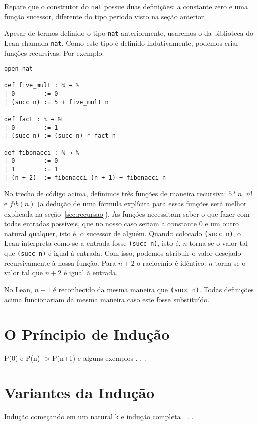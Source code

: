 Repare que o construtor do \lstinline{nat} possue duas definições: a constante zero e uma função sucessor, diferente do tipo periodo visto na seção anterior.

Apesar de termos definido o tipo \lstinline{nat} anteriormente, usaremos o da biblioteca do Lean chamada \lstinline{nat}. Como este tipo é definido indutivamente, podemos criar funções recursivas. Por exemplo:

\begin{lstlisting}
open nat

def five_mult : ℕ → ℕ
| 0        := 0
| (succ n) := 5 + five_mult n

def fact : ℕ → ℕ
| 0        := 1
| (succ n) := (succ n) * fact n

def fibonacci : ℕ → ℕ
| 0        := 0
| 1        := 1
| (n + 2)  := fibonacci (n + 1) + fibonacci n
\end{lstlisting}

No trecho de código acima, definimos três funções de maneira recursiva: $5*n$, $n!$ e $fib(n)$ (a dedução de uma fórmula explícita para essas funções será melhor explicada na seção~\ref{sec:recursao}). As funções necessitam saber o que fazer com todas entradas possíveis, que no nosso caso seriam a constante $0$ e um outro natural qualquer, isto é, o sucessor de alguém. Quando colocado \lstinline{(succ n)}, o Lean interpreta como se a entrada fosse \lstinline{(succ n)}, isto é, $n$ torna-se o valor tal que \lstinline{(succ n)} é igual à entrada. Com isso, podemos atribuir o valor desejado recursivamente à nossa função. Para $n+2$ o raciocínio é idêntico: $n$ torna-se o valor tal que $n+2$ é igual à entrada.

No Lean, $n + 1$ é reconhecido da mesma maneira que \lstinline{(succ n)}. Todas definições acima funcionariam da mesma maneira caso este fosse substituído. 

\section{O Príncipio de Indução}
\label{sec:inducao}

P(0) e P(n) -> P(n+1) e alguns exemplos . . .

\section{Variantes da Indução}

Indução começando em um natural k e indução completa . . .

